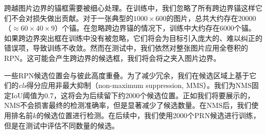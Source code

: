 \documentclass[../main.tex]{subfile}
\begin{document}
跨越图片边界的锚框需要被细心处理。在训练中，我们忽略了所有跨边界锚这样它们不会对损失做出贡献。对于一张典型的$1000\times 600$的图片，总共大约存在20000（$\approx 60 \times 40 \times 9$）个锚。在忽略跨边界锚的情况下，训练中大约存在6000个锚。如果跨边界突出框在训练中没有被忽略，它们将会为目标引入庞大的、难以纠正的错误项，导致训练不收敛。然而在测试中，我们依然对整张图片应用全卷积的RPN。这可能会产生跨边界的候选框，我们将会将之夹入图片边界。

一些RPN候选位置会与彼此高度重叠。为了减少冗余，我们在候选区域上基于它们的\textit{cls}得分应用非最大抑制（non-maximum suppression, MMS）。我们为NMS固定IoU阈值为0.7，这将会为后续留下约2000个候选位置。正如我们将要展示的，NMS不会损害最终的检测准确率，但是显著减少了候选数量。在NMS后，我们使用排名前$k$的候选位置进行检测。在后续中，我们使用2000个PRN候选进行训练，但是在测试中评估不同数量的候选。
\end{document}
